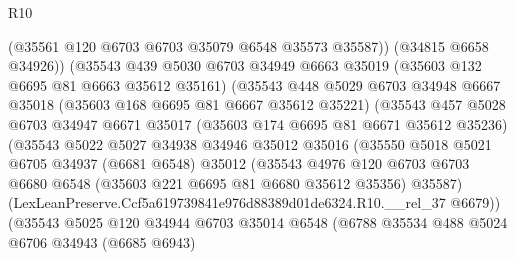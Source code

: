 \begin{lexlean}{R10}
\begin{coremodule}
                          (@35561 @120 @6703 @6703 @35079 @6548 @35573 @35587))
                        (@34815 @6658 @34926))
                      (@35543
                        @439
                        @5030
                        @6703
                        @34949
                        @6663
                        @35019
                        (@35603 @132 @6695 @81 @6663 @35612 @35161)
                        (@35543
                          @448
                          @5029
                          @6703
                          @34948
                          @6667
                          @35018
                          (@35603 @168 @6695 @81 @6667 @35612 @35221)
                          (@35543
                            @457
                            @5028
                            @6703
                            @34947
                            @6671
                            @35017
                            (@35603 @174 @6695 @81 @6671 @35612 @35236)
                            (@35543
                              @5022
                              @5027
                              @34938
                              @34946
                              @35012
                              @35016
                              (@35550
                                @5018
                                @5021
                                @6705
                                @34937
                                (@6681 @6548)
                                @35012
                                (@35543
                                  @4976
                                  @120
                                  @6703
                                  @6703
                                  @6680
                                  @6548
                                  (@35603 @221 @6695 @81 @6680 @35612 @35356)
                                  @35587)
                                (LexLeanPreserve.Ccf5a619739841e976d88389d01de6324.R10.__rel_37
                                  @6679))
                              (@35543
                                @5025
                                @120
                                @34944
                                @6703
                                @35014
                                @6548
                                (@6788
                                  @35534
                                  @488
                                  @5024
                                  @6706
                                  @34943
                                  (@6685 @6943)

\end{coremodule}
\end{lexlean}
